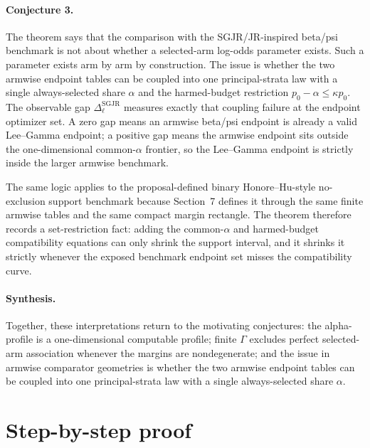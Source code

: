 \documentclass[11pt]{article}
\theoremstyle{definition}
\theoremstyle{plain}
\theoremstyle{remark}
\begin{document}
\paragraph{Conjecture 3.}
The theorem says that the comparison with the SGJR/JR-inspired beta/psi
benchmark is not about whether a selected-arm log-odds parameter exists.  Such
a parameter exists arm by arm by construction.  The issue is whether the two
armwise endpoint tables can be coupled into one principal-strata law with a
single always-selected share \(\alpha\) and the harmed-budget restriction
\(p_0-\alpha\le\kappa p_0\).  The observable gap
\(\Delta_\ell^{\mathrm{SGJR}}\) measures exactly that coupling failure at the
endpoint optimizer set.  A zero gap means an armwise beta/psi endpoint is
already a valid Lee--Gamma endpoint; a positive gap means the armwise endpoint
sits outside the one-dimensional common-\(\alpha\) frontier, so the Lee--Gamma
endpoint is strictly inside the larger armwise benchmark.

The same logic applies to the proposal-defined binary Honore--Hu-style
no-exclusion support benchmark because Section~7 defines it through the same
finite armwise tables and the same compact margin rectangle.  The theorem
therefore records a set-restriction fact: adding the common-\(\alpha\) and
harmed-budget compatibility equations can only shrink the support interval, and
it shrinks it strictly whenever the exposed benchmark endpoint set misses the
compatibility curve.

\paragraph{Synthesis.}
Together, these interpretations return to the motivating conjectures: the
alpha-profile is a one-dimensional computable profile; finite \(\Gamma\)
excludes perfect selected-arm association whenever the margins are
nondegenerate; and the issue in armwise comparator geometries is whether the
two armwise endpoint tables can be coupled into one principal-strata law with a
single always-selected share \(\alpha\).

\section{Step-by-step proof}
\end{document}

